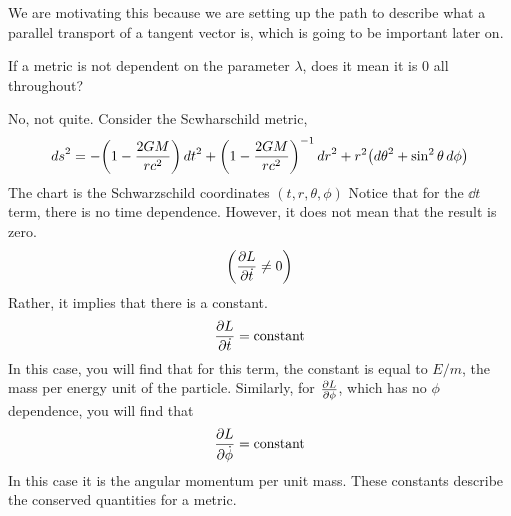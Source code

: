 	We are motivating this because we are setting up the path to describe what a parallel transport of 
	a tangent vector is, which is going to be important later on.
	\begin{question}{If a metric is not dependent on the parameter $\lambda$, does it mean it is 0 all throughout?}

		No, not quite. 
		Consider the Scwharschild metric,
		\[
			\dd{s}^2 = 
			-\pqty{
				1 - \frac{2GM}{rc^2} 
			}\dd{t}^2
			+
			\pqty{
				1 - 
				\frac{2GM}{rc^2} 
			}\inv \dd{r}^2
			+ 
			r^2 \pqty{
				\dd{\theta}^2 + 
				\sin^2\theta\dd{\phi}
			}
		\]
		The chart is the Schwarzschild coordinates $(t,r,\theta,\phi)$
		Notice that for the $\dd{t}$ term, there is no time dependence.
		However, it does not mean that the result is zero.
		\[
			\pqty{
				\pdv{L}{\dot t}\neq 0  
			}  
		\]
		Rather, it implies that there is a constant.
		\[
			{
				\pdv{L}{\dot t} = \text{constant}
			}  
		\]
		In this case, you will find that for this term, the constant
		is equal to $E/m$, the mass per energy unit of the particle.
		Similarly, for $\pdv{L}{\phi}$, which has no $\phi$ dependence,
		you will find that 
		\[
			\pdv{L}{\dot \phi} = \text{constant} 
		\]
		In this case it is the angular momentum per unit mass.
		These constants describe the conserved quantities for a metric.
	\end{question}
